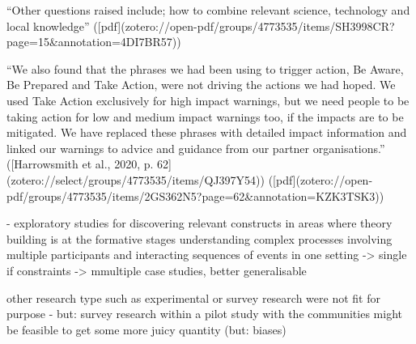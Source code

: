 “Other questions raised include; how to combine relevant science, technology and local knowledge” ([pdf](zotero://open-pdf/groups/4773535/items/SH3998CR?page=15&annotation=4DI7BR57))

“We also found that the phrases we had been using to trigger action, Be Aware, Be Prepared and Take Action, were not driving the actions we had hoped. We used Take Action exclusively for high impact warnings, but we need people to be taking action for low and medium impact warnings too, if the impacts are to be mitigated. We have replaced these phrases with detailed impact information and linked our warnings to advice and guidance from our partner organisations.” ([Harrowsmith et al., 2020, p. 62](zotero://select/groups/4773535/items/QJ397Y54)) ([pdf](zotero://open-pdf/groups/4773535/items/2GS362N5?page=62&annotation=KZK3TSK3))

- exploratory studies for discovering relevant constructs in areas where theory building is at the formative stages
understanding complex processes involving multiple participants and interacting sequences of events in one setting
-> single if constraints -> mmultiple case studies, better generalisable

other research type such as experimental or survey research were not fit for purpose - but: survey research within a pilot study with the communities might be feasible to get some more juicy quantity (but: biases)